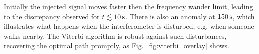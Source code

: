 \documentclass[paper-main.tex]{subfiles}
\begin{document}
Initially the injected signal moves faster then the frequency wander limit, leading to the discrepancy observed for $t\lesssim 10\,{\rm s}$. 
There is also an anomaly at $150\,{\rm s}$, which illustrates what happens when the interferometer is disturbed, e.g. when someone walks nearby. 
The Viterbi algorithm is robust against such disturbances, recovering the optimal path promptly, as Fig.~\ref{fig:viterbi_overlay} shows. 

\end{document}
